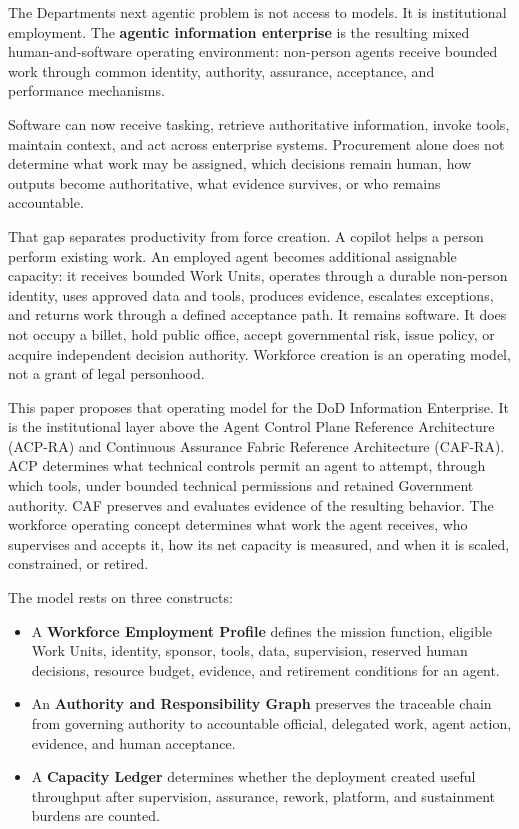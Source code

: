 \documentclass[11pt]{article}
\begin{document}
\makepapercover

{\small\renewcommand{\baselinestretch}{0.96}\selectfont\tableofcontents}
\newpage

\begin{execsummary}
The Department\textquotesingle s next agentic problem is not access to
models. It is institutional employment. The \textbf{agentic information
enterprise} is the resulting mixed human-and-software operating
environment: non-person agents receive bounded work through common
identity, authority, assurance, acceptance, and performance mechanisms.

Software can now receive tasking, retrieve authoritative information,
invoke tools, maintain context, and act across enterprise systems.
Procurement alone does not determine what work may be assigned, which
decisions remain human, how outputs become authoritative, what evidence
survives, or who remains accountable.

That gap separates productivity from force creation. A copilot helps a
person perform existing work. An employed agent becomes additional
assignable capacity: it receives bounded Work Units, operates through a
durable non-person identity, uses approved data and tools, produces
evidence, escalates exceptions, and returns work through a defined
acceptance path. It remains software. It does not occupy a billet, hold
public office, accept governmental risk, issue policy, or acquire
independent decision authority. Workforce creation is an operating
model, not a grant of legal personhood.

This paper proposes that operating model for the DoD Information
Enterprise. It is the institutional layer above the Agent Control Plane
Reference Architecture (ACP-RA) and Continuous Assurance Fabric
Reference Architecture (CAF-RA). ACP determines what technical controls
permit an agent to attempt, through which tools, under bounded technical
permissions and retained Government authority. CAF preserves and
evaluates evidence of the resulting behavior. The workforce operating
concept determines what work the agent receives, who supervises and
accepts it, how its net capacity is measured, and when it is scaled,
constrained, or retired.

The model rests on three constructs:

\begin{itemize}
\tightlist
\item
  A \textbf{Workforce Employment Profile} defines the mission function,
  eligible Work Units, identity, sponsor, tools, data, supervision,
  reserved human decisions, resource budget, evidence, and retirement
  conditions for an agent.
\item
  An \textbf{Authority and Responsibility Graph} preserves the traceable
  chain from governing authority to accountable official, delegated
  work, agent action, evidence, and human acceptance.
\item
  A \textbf{Capacity Ledger} determines whether the deployment created
  useful throughput after supervision, assurance, rework, platform, and
  sustainment burdens are counted.
\end{itemize}


\end{execsummary}
\end{document}
